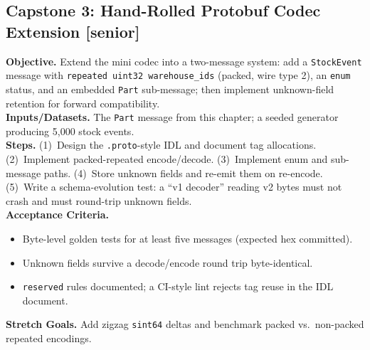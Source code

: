 \subsection{Capstone 3: Hand-Rolled Protobuf Codec Extension [senior]}
\textbf{Objective.} Extend the mini codec into a two-message system: add a
\texttt{StockEvent} message with \texttt{repeated uint32 warehouse\_ids}
(packed, wire type 2), an \texttt{enum} status, and an embedded \texttt{Part}
sub-message; then implement unknown-field retention for forward compatibility.\\
\textbf{Inputs/Datasets.} The \texttt{Part} message from this chapter; a seeded
generator producing 5{,}000 stock events.\\
\textbf{Steps.} (1)~Design the \texttt{.proto}-style IDL and document tag
allocations. (2)~Implement packed-repeated encode/decode. (3)~Implement enum and
sub-message paths. (4)~Store unknown fields and re-emit them on re-encode.
(5)~Write a schema-evolution test: a ``v1 decoder'' reading v2 bytes must not
crash and must round-trip unknown fields.\\
\textbf{Acceptance Criteria.}
\begin{itemize}
  \item[$\square$] Byte-level golden tests for at least five messages (expected
        hex committed).
  \item[$\square$] Unknown fields survive a decode/encode round trip byte-identical.
  \item[$\square$] \texttt{reserved} rules documented; a CI-style lint rejects tag
        reuse in the IDL document.
\end{itemize}
\textbf{Stretch Goals.} Add zigzag \texttt{sint64} deltas and benchmark packed
vs.\ non-packed repeated encodings.

